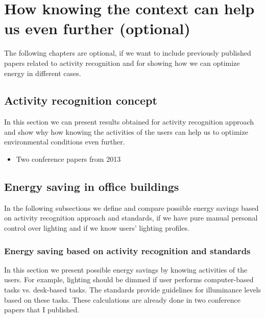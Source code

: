 \documentclass[a4paper]{article}
\begin{document}
\section {\color{gray}How knowing the context can help us even further (optional)}

The following chapters are optional, if we want to include previously published papers related to activity recognition and for showing how we can optimize energy in different cases. 

\subsection{\color{gray}Activity recognition concept}

In this section we can present results obtained for activity recognition approach and show why how knowing the activities of the users can help us to optimize environmental conditions even further.

\begin{itemize}
	\item{\color{gray}Two conference papers from 2013}
\end{itemize}

\subsection{\color{gray}Energy saving in office buildings}

In the following subsections we define and compare possible energy savings based on activity recognition approach and standards, if we have pure manual personal control over lighting and if we know users' lighting profiles.

\subsubsection{\color{gray}Energy saving based on activity recognition and standards}

In this section we present possible energy savings by knowing activities of the users. For example, lighting should be dimmed if user performs computer-based tasks vs. desk-based tasks. The standards provide guidelines for illuminance levels based on these tasks. These calculations are already done in two conference papers that I published.
\end{document}
